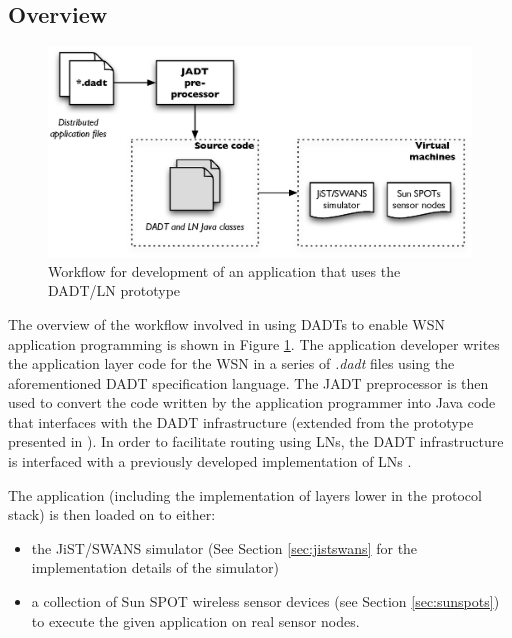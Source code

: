 \subsection{Overview} \label{subsec:overview}
\begin{figure}
\centering
\includegraphics[width=\textwidth]{img/DADTLN_workflow.eps} 
\caption[DADT/LN application workflow]{Workflow for development of an application that uses
the DADT/LN prototype}
\label{Fig:DADTLN_workflow}
\end{figure} 
The overview of the workflow involved in using DADTs to enable WSN application
programming is shown in Figure \ref{Fig:DADTLN_workflow}. The application
developer writes the application layer code for the WSN  in a series of \emph{.dadt} files using the aforementioned DADT
specification language. The JADT preprocessor is then used to convert the code written by the
application programmer into Java code that interfaces with the DADT infrastructure (extended from the prototype presented in \cite{migliavacca_DADT:2006}). In order to facilitate routing using LNs, the DADT infrastructure is interfaced with a
previously developed implementation of LNs \cite{mottola_LNAbstraction}. 

The application (including the implementation of layers lower in the protocol
stack) is then loaded on to either:
\begin{itemize}
\item the JiST/SWANS simulator \cite{barr_JIST:2005, barr_SWANS} (See Section
\ref{sec:jistswans} for the implementation details of the simulator) 
\item a collection of Sun SPOT wireless sensor devices
\cite{simon_squawk:2006} (see Section \ref{sec:sunspots}) to execute the given 
application on real sensor nodes.
\end{itemize}


